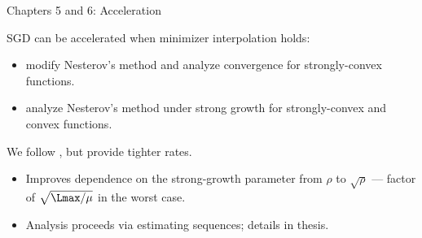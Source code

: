 \documentclass[mathserif,notheorems, hyperref={colorlinks, citecolor=blue, urlcolor=blue, linkcolor=blue}]{beamer}
\begin{document}


    \begin{frame}{Chapters 5 and 6: Acceleration}

       SGD can be accelerated when minimizer interpolation holds:
       \begin{itemize}
           \item \citet{liu2020accelerating} modify Nesterov's method and analyze convergence for strongly-convex functions. 
      \vspace{1ex}
           \item \citet{vaswani2019fast} analyze Nesterov's method under strong growth for strongly-convex and convex functions. 
       \end{itemize}

      \vspace{2ex}
      We follow \citet{vaswani2019fast}, but provide tighter rates. 
      \begin{itemize}
          \item Improves dependence on the strong-growth parameter from \( \rho \) to \( \sqrt{\rho} \) --- factor of \( \sqrt{\Lmax / \mu} \) in the worst case. 
        \vspace{1ex}
          \item Analysis proceeds via estimating sequences; details in thesis.  
      \end{itemize}
        
    \end{frame}
\end{document}
